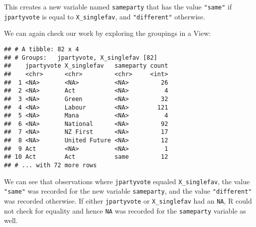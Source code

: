 \documentclass[]{article}
\newenvironment{Shaded}{\begin{snugshade}}{\end{snugshade}}
\newcommand{\KeywordTok}[1]{\textcolor[rgb]{0.13,0.29,0.53}{\textbf{#1}}}
\newcommand{\DataTypeTok}[1]{\textcolor[rgb]{0.13,0.29,0.53}{#1}}
\newcommand{\StringTok}[1]{\textcolor[rgb]{0.31,0.60,0.02}{#1}}
\newcommand{\OperatorTok}[1]{\textcolor[rgb]{0.81,0.36,0.00}{\textbf{#1}}}
\newcommand{\NormalTok}[1]{#1}
\begin{document}
\begin{Shaded}
\end{Shaded}

This creates a new variable named \texttt{sameparty} that has the value
\texttt{"same"} if \texttt{jpartyvote} is equal to
\texttt{X\_singlefav}, and \texttt{"different"} otherwise.

We can again check our work by exploring the groupings in a View:

\begin{Shaded}
\end{Shaded}

\begin{verbatim}
## # A tibble: 82 x 4
## # Groups:   jpartyvote, X_singlefav [82]
##    jpartyvote X_singlefav   sameparty count
##    <chr>      <chr>         <chr>     <int>
##  1 <NA>       <NA>          <NA>         26
##  2 <NA>       Act           <NA>          4
##  3 <NA>       Green         <NA>         32
##  4 <NA>       Labour        <NA>        121
##  5 <NA>       Mana          <NA>          4
##  6 <NA>       National      <NA>         92
##  7 <NA>       NZ First      <NA>         17
##  8 <NA>       United Future <NA>         12
##  9 Act        <NA>          <NA>          1
## 10 Act        Act           same         12
## # ... with 72 more rows
\end{verbatim}

We can see that observations where \texttt{jpartyvote} equaled
\texttt{X\_singlefav}, the value \texttt{"same"} was recorded for the
new variable \texttt{sameparty}, and the value \texttt{"different"} was
recorded otherwise. If either \texttt{jpartyvote} or
\texttt{X\_singlefav} had an \texttt{NA}, R could not check for equality
and hence \texttt{NA} was recorded for the \texttt{sameparty} variable
as well.
\end{document}
